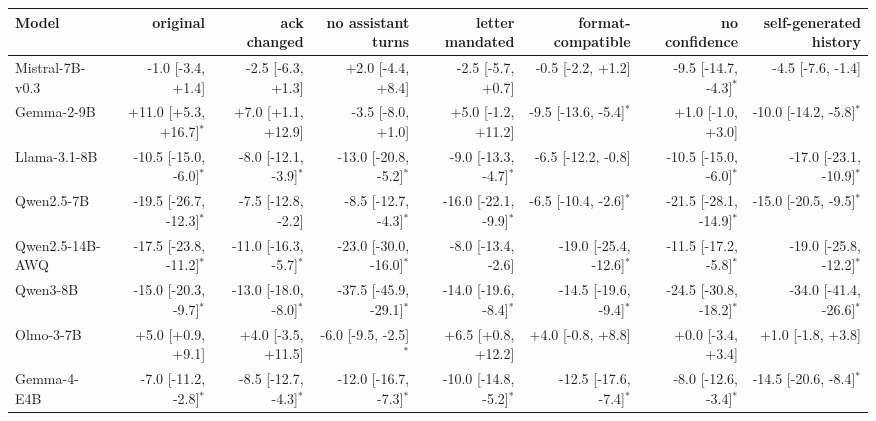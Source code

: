 \begin{tabular}{lrrrrrrr}
\toprule
Model & original & ack changed & no assistant turns & letter mandated & format-compatible & no confidence & self-generated history \\
\midrule
Mistral-7B-v0.3 & -1.0 [-3.4, +1.4] & -2.5 [-6.3, +1.3] & +2.0 [-4.4, +8.4] & -2.5 [-5.7, +0.7] & -0.5 [-2.2, +1.2] & -9.5 [-14.7, -4.3]$^{*}$ & -4.5 [-7.6, -1.4] \\
Gemma-2-9B & +11.0 [+5.3, +16.7]$^{*}$ & +7.0 [+1.1, +12.9] & -3.5 [-8.0, +1.0] & +5.0 [-1.2, +11.2] & -9.5 [-13.6, -5.4]$^{*}$ & +1.0 [-1.0, +3.0] & -10.0 [-14.2, -5.8]$^{*}$ \\
Llama-3.1-8B & -10.5 [-15.0, -6.0]$^{*}$ & -8.0 [-12.1, -3.9]$^{*}$ & -13.0 [-20.8, -5.2]$^{*}$ & -9.0 [-13.3, -4.7]$^{*}$ & -6.5 [-12.2, -0.8] & -10.5 [-15.0, -6.0]$^{*}$ & -17.0 [-23.1, -10.9]$^{*}$ \\
Qwen2.5-7B & -19.5 [-26.7, -12.3]$^{*}$ & -7.5 [-12.8, -2.2] & -8.5 [-12.7, -4.3]$^{*}$ & -16.0 [-22.1, -9.9]$^{*}$ & -6.5 [-10.4, -2.6]$^{*}$ & -21.5 [-28.1, -14.9]$^{*}$ & -15.0 [-20.5, -9.5]$^{*}$ \\
Qwen2.5-14B-AWQ & -17.5 [-23.8, -11.2]$^{*}$ & -11.0 [-16.3, -5.7]$^{*}$ & -23.0 [-30.0, -16.0]$^{*}$ & -8.0 [-13.4, -2.6] & -19.0 [-25.4, -12.6]$^{*}$ & -11.5 [-17.2, -5.8]$^{*}$ & -19.0 [-25.8, -12.2]$^{*}$ \\
Qwen3-8B & -15.0 [-20.3, -9.7]$^{*}$ & -13.0 [-18.0, -8.0]$^{*}$ & -37.5 [-45.9, -29.1]$^{*}$ & -14.0 [-19.6, -8.4]$^{*}$ & -14.5 [-19.6, -9.4]$^{*}$ & -24.5 [-30.8, -18.2]$^{*}$ & -34.0 [-41.4, -26.6]$^{*}$ \\
Olmo-3-7B & +5.0 [+0.9, +9.1] & +4.0 [-3.5, +11.5] & -6.0 [-9.5, -2.5]$^{*}$ & +6.5 [+0.8, +12.2] & +4.0 [-0.8, +8.8] & +0.0 [-3.4, +3.4] & +1.0 [-1.8, +3.8] \\
Gemma-4-E4B & -7.0 [-11.2, -2.8]$^{*}$ & -8.5 [-12.7, -4.3]$^{*}$ & -12.0 [-16.7, -7.3]$^{*}$ & -10.0 [-14.8, -5.2]$^{*}$ & -12.5 [-17.6, -7.4]$^{*}$ & -8.0 [-12.6, -3.4]$^{*}$ & -14.5 [-20.6, -8.4]$^{*}$ \\
\bottomrule
\end{tabular}
